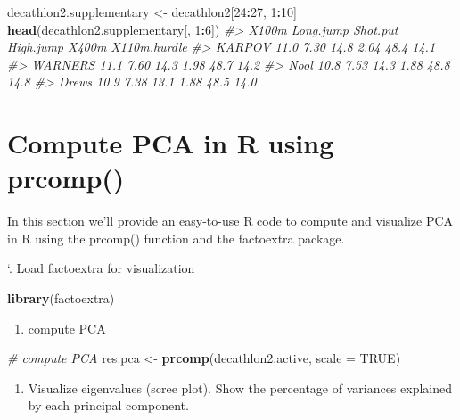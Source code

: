 \documentclass[]{book}
\newenvironment{Shaded}{\begin{snugshade}}{\end{snugshade}}
\newcommand{\CommentTok}[1]{\textcolor[rgb]{0.56,0.35,0.01}{\textit{#1}}}
\newcommand{\DataTypeTok}[1]{\textcolor[rgb]{0.13,0.29,0.53}{#1}}
\newcommand{\DecValTok}[1]{\textcolor[rgb]{0.00,0.00,0.81}{#1}}
\newcommand{\KeywordTok}[1]{\textcolor[rgb]{0.13,0.29,0.53}{\textbf{#1}}}
\newcommand{\NormalTok}[1]{#1}
\newcommand{\OperatorTok}[1]{\textcolor[rgb]{0.81,0.36,0.00}{\textbf{#1}}}
\newcommand{\OtherTok}[1]{\textcolor[rgb]{0.56,0.35,0.01}{#1}}
\newcommand{\StringTok}[1]{\textcolor[rgb]{0.31,0.60,0.02}{#1}}
\providecommand{\tightlist}{%
  \setlength{\itemsep}{0pt}\setlength{\parskip}{0pt}}
\begin{document}
\begin{Shaded}
\begin{Highlighting}[]
\NormalTok{decathlon2.supplementary <-}\StringTok{ }\NormalTok{decathlon2[}\DecValTok{24}\OperatorTok{:}\DecValTok{27}\NormalTok{, }\DecValTok{1}\OperatorTok{:}\DecValTok{10}\NormalTok{]}
\KeywordTok{head}\NormalTok{(decathlon2.supplementary[, }\DecValTok{1}\OperatorTok{:}\DecValTok{6}\NormalTok{])}
\CommentTok{#>         X100m Long.jump Shot.put High.jump X400m X110m.hurdle}
\CommentTok{#> KARPOV   11.0      7.30     14.8      2.04  48.4         14.1}
\CommentTok{#> WARNERS  11.1      7.60     14.3      1.98  48.7         14.2}
\CommentTok{#> Nool     10.8      7.53     14.3      1.88  48.8         14.8}
\CommentTok{#> Drews    10.9      7.38     13.1      1.88  48.5         14.0}
\end{Highlighting}
\end{Shaded}

\hypertarget{compute-pca-in-r-using-prcomp}{%
\section{Compute PCA in R using prcomp()}\label{compute-pca-in-r-using-prcomp}}

In this section we'll provide an easy-to-use R code to compute and visualize PCA in R using the prcomp() function and the factoextra package.

`. Load factoextra for visualization

\begin{Shaded}
\begin{Highlighting}[]
\KeywordTok{library}\NormalTok{(factoextra)}
\end{Highlighting}
\end{Shaded}

\begin{enumerate}
\def\labelenumi{\arabic{enumi}.}
\setcounter{enumi}{1}
\tightlist
\item
  compute PCA
\end{enumerate}

\begin{Shaded}
\begin{Highlighting}[]
\CommentTok{# compute PCA}
\NormalTok{res.pca <-}\StringTok{ }\KeywordTok{prcomp}\NormalTok{(decathlon2.active, }\DataTypeTok{scale =} \OtherTok{TRUE}\NormalTok{)}
\end{Highlighting}
\end{Shaded}

\begin{enumerate}
\def\labelenumi{\arabic{enumi}.}
\setcounter{enumi}{2}
\tightlist
\item
  Visualize eigenvalues (scree plot). Show the percentage of variances explained by each principal component.
\end{enumerate}
\end{document}

